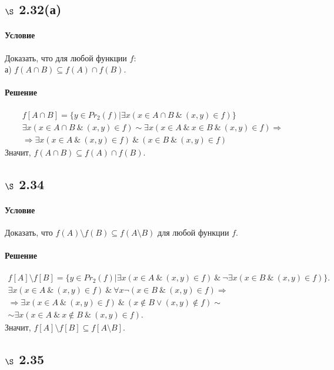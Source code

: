\documentclass[a4paper,12pt]{article}
\begin{document}
\subsection*{$\S$ 2.32(а)}
\paragraph*{Условие}
Доказать, что для любой функции $f$: \\
а) $f(A\cap B) \subseteq f(A) \cap f(B)$.
\paragraph*{Решение}
\begin{gather*}
f[A\cap B] = \{y\in Pr_2(f)|\exists x (x\in A\cap B \ \& \ (x,y)\in f)\} \\
\exists x(x\in A\cap B \ \& \ (x,y)\in f) \sim \exists x(x\in A \ \& \ x\in B \ \& \ (x,y)\in f) \Rightarrow \\
\Rightarrow \exists x(x\in A \ \&\ (x,y)\in f) \ \& \ (x\in B \ \& \ (x,y)\in f)
\end{gather*}
Значит, $f(A\cap B) \subseteq f(A) \cap f(B)$.

\subsection*{$\S$ 2.34}
\paragraph*{Условие}
Доказать, что $f(A)\setminus f(B) \subseteq f(A\setminus B)$ для любой функции $f$. 
\paragraph*{Решение}
\begin{gather*}
f[A]\setminus f[B] = \{y\in Pr_2(f)|\exists x(x\in A\ \& \ (x,y)\in f)\ \& \ \neg \exists x( x\in B \ \& \ (x,y)\in f)\}.\\
\exists x(x\in A\ \& \ (x,y)\in f)\ \& \ \forall x \neg ( x\in B \ \& \ (x,y)\in f) \Rightarrow \\ \Rightarrow \exists x(x\in A\ \& \ (x,y)\in f)\ \& \  ( x\notin B \vee (x,y)\notin f) \sim \\
\sim \exists x (x\in A \ \& \ x\notin B \ \& \ (x,y)\in f).
\end{gather*}
Значит, $f[A]\setminus f[B] \subseteq f[A\setminus B]$.

\subsection*{$\S$ 2.35}
\end{document}
